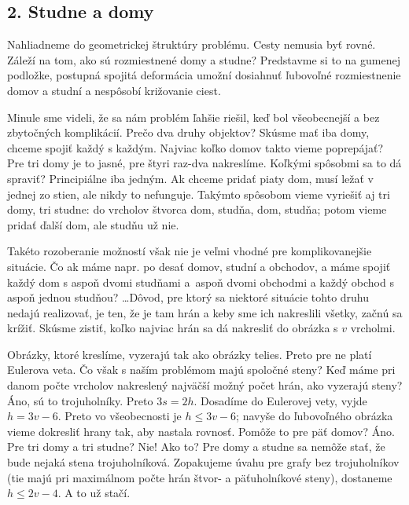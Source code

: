 \documentclass[a4paper]{article}
\begin{document}
\subsection*{2. Studne a domy}

Nahliadneme do geometrickej štruktúry problému. Cesty nemusia byť rovné. Záleží na tom, ako sú rozmiestnené domy a studne? Predstavme si to na gumenej podložke, postupná spojitá deformácia umožní dosiahnuť ľubovoľné rozmiestnenie domov a studní a nespôsobí križovanie ciest.

Minule sme videli, že sa nám problém ľahšie riešil, keď bol všeobecnejší a bez zbytočných komplikácií. Prečo dva druhy objektov? Skúsme mať iba domy, chceme spojiť každý s každým. Najviac koľko domov takto vieme poprepájať? Pre tri domy je to jasné, pre štyri raz-dva nakreslíme. Koľkými spôsobmi sa to dá spraviť? Principiálne iba jedným. Ak chceme pridať piaty dom, musí ležať v jednej zo stien, ale nikdy to nefunguje. Takýmto spôsobom vieme vyriešiť aj tri domy, tri studne: do vrcholov štvorca dom, studňa, dom, studňa; potom vieme pridať ďalší dom, ale studňu už nie.

Takéto rozoberanie možností však nie je veľmi vhodné pre komplikovanejšie situácie. Čo ak máme napr. po desať domov, studní a obchodov, a máme spojiť každý dom s aspoň dvomi studňami a~aspoň dvomi obchodmi a každý obchod s aspoň jednou studňou? \dots Dôvod, pre ktorý sa niektoré situácie tohto druhu nedajú realizovať, je ten, že je tam  hrán a keby sme ich nakreslili všetky, začnú sa krížiť. Skúsme zistiť, koľko najviac hrán sa dá nakresliť do obrázka s $v$ vrcholmi.

Obrázky, ktoré kreslíme, vyzerajú tak ako obrázky telies. Preto pre ne platí Eulerova veta. Čo však s naším problémom majú spoločné steny? Keď máme pri danom počte vrcholov nakreslený najväčší možný počet hrán, ako vyzerajú steny? Áno, sú to trojuholníky. Preto $3s = 2h$. Dosadíme do Eulerovej vety, vyjde $h = 3v-6$. Preto vo všeobecnosti je $h\le 3v-6$; navyše do ľubovoľného obrázka vieme dokresliť hrany tak, aby nastala rovnosť. Pomôže to pre päť domov? Áno. Pre tri domy a tri studne? Nie! Ako to? Pre domy a studne sa nemôže stať, že bude nejaká stena trojuholníková. Zopakujeme úvahu pre grafy bez trojuholníkov (tie majú pri maximálnom počte hrán štvor- a päťuholníkové steny), dostaneme $h\le 2v-4$. A to už stačí.

\medskip
\noindent[3. Neriešime.]

\smallskip
{}
\end{document}
